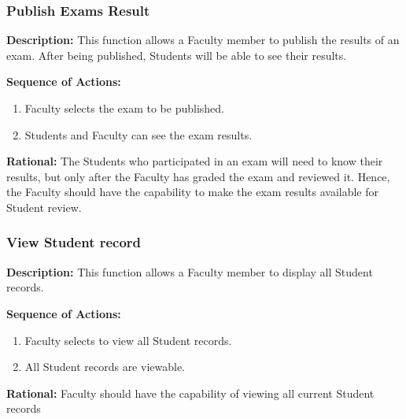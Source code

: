    \subsubsection{\large Publish Exams Result} 
   \begin{boxed} %
      \textbf{Description:}
      This function allows a Faculty member to publish the results of an
         exam. After being published, Students will be able to see their
         results.
         
         \vspace{3mm}
         \textbf{Sequence of Actions:}
         \begin{enumerate}
               
            \item Faculty selects the exam to be published.
            \item Students and Faculty can see the exam results.
      \end{enumerate}

         \textbf{Rational:}
         The Students who participated in an exam will need to know their
         results, but only after the Faculty has graded the exam and reviewed
         it. Hence, the Faculty should have the capability to make the exam
         results available for Student review.
   \end{boxed} %

   \subsubsection{\large View Student record} 
   \begin{boxed} %
      \textbf{Description:}
      This function allows a Faculty member to display all Student
         records.
         
         \vspace{3mm}
         \textbf{Sequence of Actions:}
         \begin{enumerate}
               
            \item Faculty selects to view all Student records.
            \item All Student records are viewable.
      \end{enumerate}

         \textbf{Rational:}
         Faculty should have the capability of viewing all current Student
         records
   \end{boxed} %

